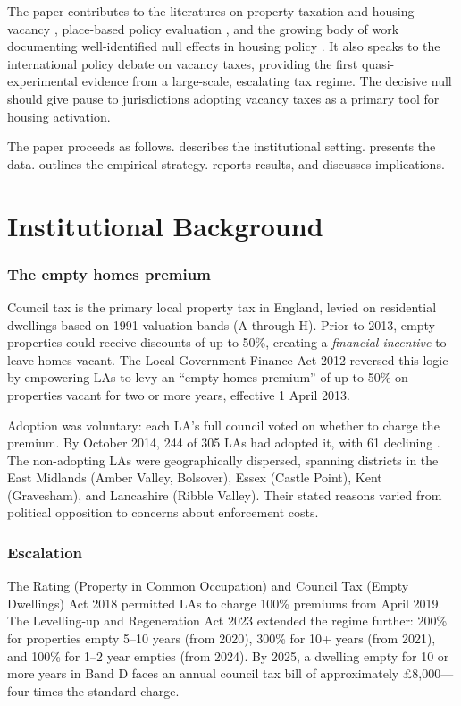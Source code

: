 \documentclass[12pt]{article}
\begin{document}
The paper contributes to the literatures on property taxation and housing vacancy \citep{sirmans2009property, glaeser2005urban}, place-based policy evaluation \citep{neumark2015place, kline2013place}, and the growing body of work documenting well-identified null effects in housing policy \citep{diamond2019effects, autor2014housing}. It also speaks to the international policy debate on vacancy taxes, providing the first quasi-experimental evidence from a large-scale, escalating tax regime. The decisive null should give pause to jurisdictions adopting vacancy taxes as a primary tool for housing activation.

The paper proceeds as follows.  describes the institutional setting.  presents the data.  outlines the empirical strategy.  reports results, and  discusses implications.

\section{Institutional Background}
\label{sec:background}

\subsubsection*{The empty homes premium} Council tax is the primary local property tax in England, levied on residential dwellings based on 1991 valuation bands (A through H). Prior to 2013, empty properties could receive discounts of up to 50\%, creating a \emph{financial incentive} to leave homes vacant. The Local Government Finance Act 2012 reversed this logic by empowering LAs to levy an ``empty homes premium'' of up to 50\% on properties vacant for two or more years, effective 1 April 2013.

Adoption was voluntary: each LA's full council voted on whether to charge the premium. By October 2014, 244 of 305 LAs had adopted it, with 61 declining \citep{mhclg2014ctb}. The non-adopting LAs were geographically dispersed, spanning districts in the East Midlands (Amber Valley, Bolsover), Essex (Castle Point), Kent (Gravesham), and Lancashire (Ribble Valley). Their stated reasons varied from political opposition to concerns about enforcement costs.

\subsubsection*{Escalation} The Rating (Property in Common Occupation) and Council Tax (Empty Dwellings) Act 2018 permitted LAs to charge 100\% premiums from April 2019. The Levelling-up and Regeneration Act 2023 extended the regime further: 200\% for properties empty 5--10 years (from 2020), 300\% for 10+ years (from 2021), and 100\% for 1--2 year empties (from 2024). By 2025, a dwelling empty for 10 or more years in Band D faces an annual council tax bill of approximately \pounds 8,000---four times the standard charge.
\end{document}
